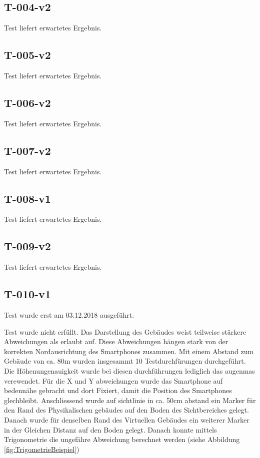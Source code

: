 \documentclass[a4paper]{scrreprt}
\begin{document}
\subsection{T-004-v2}
Test liefert erwartetes Ergebnis.
\subsection{T-005-v2}
Test liefert erwartetes Ergebnis.
\subsection{T-006-v2}
Test liefert erwartetes Ergebnis.
\subsection{T-007-v2}
Test liefert erwartetes Ergebnis.
\subsection{T-008-v1}
Test liefert erwartetes Ergebnis.
\subsection{T-009-v2}
Test liefert erwartetes Ergebnis.
\subsection{T-010-v1}
Test wurde erst am 03.12.2018 ausgeführt.

Test wurde nicht erfüllt.
Das Darstellung des Gebäudes weist teilweise stärkere Abweichungen als erlaubt auf. Diese Abweichungen hängen stark von der korrekten Nordausrichtung des Smartphones zusammen.
Mit einem Abstand zum Gebäude von ca. 80m wurden insgesammt 10 Testdurchfürungen durchgeführt. Die Höhenungenauigkeit wurde bei diesen durchführungen lediglich das augenmas verewendet. Für die X und Y abweichungen wurde das Smartphone auf bedennähe gebracht und dort Fixiert, damit die Position des Smartphones glechbleibt. Anschliessend wurde auf sichtlinie in ca. 50cm abstand ein Marker für den Rand des Physikalischen gebäudes auf den Boden des Sichtbereiches gelegt. Danach wurde für denselben Rand des Virtuellen Gebäudes ein weiterer Marker in der Gleichen Distanz auf den Boden gelegt. Danach konnte mittels Trigonometrie die ungefähre Abweichung berechnet werden (siehe Abbildung \ref{fig:TrigometrieBeispiel})
\end{document}
